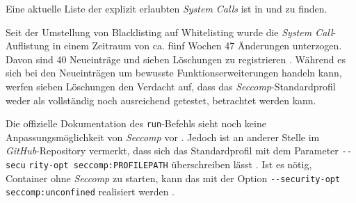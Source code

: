 \documentclass[../main.tex]{subfiles}
\begin{document}
			Eine aktuelle Liste der explizit erlaubten \emph{System Calls} ist in \cite{githubSeccompProfile} und \cite{githubSeccompDoc} zu finden.

			Seit der Umstellung von Blacklisting auf Whitelisting wurde die \emph{System Call}-Auflistung in einem Zeitraum von ca. fünf Wochen 47 Änderungen unterzogen. Davon sind 40 Neueinträge und sieben Löschungen zu registrieren \cite{githubSeccompProfileHistory}. Während es sich bei den Neueinträgen um bewusste Funktionserweiterungen handeln kann, werfen sieben Löschungen den Verdacht auf, dass das \emph{Seccomp}-Standardprofil weder als vollständig noch ausreichend getestet, betrachtet werden kann.

			Die offizielle Dokumentation des \texttt{run}-Befehls sieht noch keine Anpassungsmöglichkeit von \emph{Seccomp} vor \cite{dockerRun}. Jedoch ist an anderer Stelle im \emph{GitHub}-Repository vermerkt, dass sich das Standardprofil mit dem Parameter \texttt{-{}-secu} \texttt{rity-opt seccomp:PROFILEPATH} überschreiben lässt \cite{githubSeccompDoc}. Ist es nötig, Container ohne \emph{Seccomp} zu starten, kann das mit der Option \texttt{-{}-security-opt seccomp:unconfined} realisiert werden \cite{dockerRun}\cite{docker110Security}.




\end{document}
